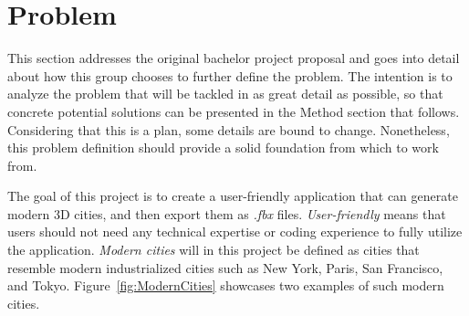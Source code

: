 \section{Problem}
\label{sec:problem}

This section addresses the original bachelor project proposal and goes into detail about how this group chooses to further define the problem.
The intention is to analyze the problem that will be tackled in as great detail as possible, so that concrete potential solutions can be presented in the Method section that follows.
Considering that this is a plan, some details are bound to change.
Nonetheless, this problem definition should provide a solid foundation from which to work from.

The goal of this project is to create a user-friendly application that can generate modern 3D cities, and then export them as \textit{.fbx} files.
\textit{User-friendly} means that users should not need any technical expertise or coding experience to fully utilize the application.
\textit{Modern cities} will in this project be defined as cities that resemble modern industrialized cities such as New York, Paris, San Francisco, and Tokyo.
Figure~\ref{fig:ModernCities} showcases two examples of such modern cities.

